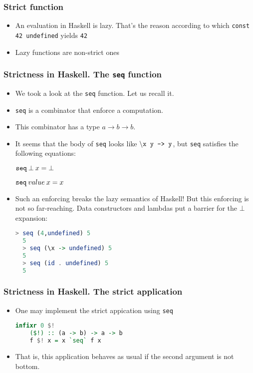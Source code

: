 \documentclass[10pt,pdf,utf8,russian,aspectratio=169]{beamer}
\begin{document}
\begin{frame}
  \frametitle{Strict function}
  \begin{itemize}
    \item An evaluation in Haskell is lazy. 
    That's the reason according to which \verb"const 42 undefined" yields \verb"42"
    \item Lazy functions are non-strict ones
  \end{itemize}
\end{frame}

\begin{frame}[fragile]
  \frametitle{Strictness in Haskell. The \verb"seq" function}
\begin{itemize}
  \item We took a look at the \verb"seq" function. Let us recall it.
  \item \verb"seq" is a combinator that enforce a computation.
  \item This combinator has a type $a \to b \to b$.
  \item It seems that the body of \verb"seq" looks like $\setminus\verb"x y -> y"$, but \verb"seq" satisfies the following equations:
  \begin{center}
    $\verb"seq" \: \bot \: x = \bot$

    $\verb"seq" \: value \: x = x$
  \end{center}
  \item Such an enforcing breaks the lazy semantics of Haskell! But this enforcing is not so far-reaching. 
  Data constructors and lambdas put a barrier for the $\bot$ expansion:
  \begin{lstlisting}[language=Haskell]
  > seq (4,undefined) 5
  5
  > seq (\x -> undefined) 5
  5
  > seq (id . undefined) 5
  5
  \end{lstlisting}
\end{itemize}
\end{frame}

\begin{frame}[fragile]
  \frametitle{Strictness in Haskell. The strict application}
  \begin{itemize}
    \item One may implement the strict appication using \verb"seq"
    \begin{lstlisting}[language=Haskell]
    infixr 0 $!
    ($!) :: (a -> b) -> a -> b
    f $! x = x `seq` f x
    \end{lstlisting}
    \item That is, this application behaves as usual if the second argument is not bottom.
  \end{itemize}
\end{frame}
\end{document}
